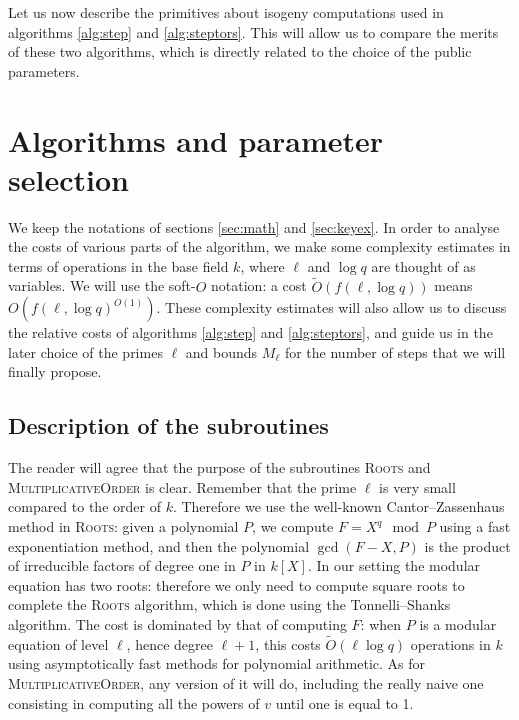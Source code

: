 \documentclass{article}
\newcommand{\softO}{\tilde{O}}
\newcommand{\algnamestyle}[1]{\textsc{#1}}
\theoremstyle{definition}
\begin{document}
Let us now describe the primitives about isogeny computations used in algorithms
\ref{alg:step} and \ref{alg:steptors}. This will allow us to compare the merits
of these two algorithms, which is directly related to the choice of the public
parameters.


\section{Algorithms and parameter selection}

We keep the notations of sections \ref{sec:math}
and \ref{sec:keyex}. In order to analyse the costs of various parts of the
algorithm, we make some complexity estimates in terms of operations in the
base field $k$, where $\ell$ and $\log q$ are thought of as variables.
We will use the soft-$O$ notation: a cost $\softO(f(\ell, \log q))$ means
$O(f(\ell, \log q)^{O(1)})$. These complexity estimates will also
allow us to discuss the relative costs of algorithms \ref{alg:step} and
\ref{alg:steptors}, and guide us in the later choice of the primes $\ell$
and bounds $M_\ell$ for the number of steps that we will finally propose.

\subsection{Description of the subroutines}


The reader will agree that the purpose of the subroutines \algnamestyle{Roots}
and \algnamestyle{MultiplicativeOrder} is clear. Remember that the
prime $\ell$ is very small compared to the order of $k$. Therefore we use the
well-known Cantor--Zassenhaus method in \algnamestyle{Roots}:
given a polynomial $P$,
we compute $F = X^q \mod P$ using a fast exponentiation method, and then the polynomial
$\gcd(F - X, P)$ is the product of irreducible factors of degree one in $P$
in $k[X]$. In our setting the modular equation has two roots: therefore we only need
to compute square roots to complete the \algnamestyle{Roots} algorithm, which is
done using the Tonnelli--Shanks algorithm. The cost is dominated
by that of computing $F$: when $P$ is a modular equation
of level $\ell$, hence degree $\ell + 1$, this costs $\softO(\ell\log q)$ operations in $k$
using asymptotically fast methods for polynomial arithmetic. As for \algnamestyle{MultiplicativeOrder},
any version of it will do, including the really naive one consisting in computing
all the powers of $v$ until one is equal to 1.
\end{document}

